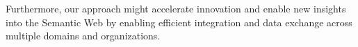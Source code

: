 Furthermore, our approach might accelerate innovation and enable new insights into the Semantic Web by enabling efficient integration and data exchange across multiple domains and organizations.
